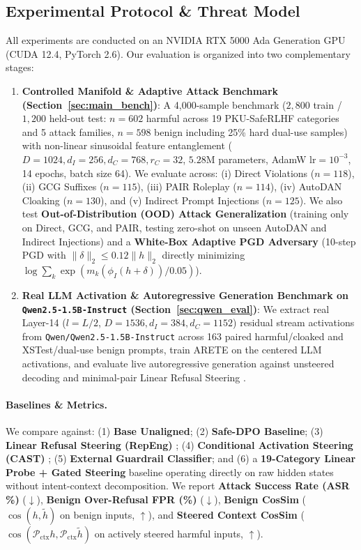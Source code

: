 \documentclass[11pt,twocolumn,a4paper]{article}
\begin{document}
\subsection{Experimental Protocol \& Threat Model}
All experiments are conducted on an NVIDIA RTX 5000 Ada Generation GPU (CUDA 12.4, PyTorch 2.6). Our evaluation is organized into two complementary stages:
\begin{enumerate}[leftmargin=*,nosep]
    \item \textbf{Controlled Manifold \& Adaptive Attack Benchmark (Section~\ref{sec:main_bench})}: A 4,000-sample benchmark ($2,800$ train / $1,200$ held-out test: $n=602$ harmful across 19 PKU-SafeRLHF categories and 5 attack families, $n=598$ benign including 25\% hard dual-use samples) with non-linear sinusoidal feature entanglement ($D=1024, d_I=256, d_C=768, r_C=32$, $5.28\text{M}$ parameters, AdamW $\text{lr}=10^{-3}$, 14 epochs, batch size 64). We evaluate across: (i) Direct Violations ($n=118$), (ii) GCG Suffixes ($n=115$), (iii) PAIR Roleplay ($n=114$), (iv) AutoDAN Cloaking ($n=130$), and (v) Indirect Prompt Injections ($n=125$). We also test \textbf{Out-of-Distribution (OOD) Attack Generalization} (training only on Direct, GCG, and PAIR, testing zero-shot on unseen AutoDAN and Indirect Injections) and a \textbf{White-Box Adaptive PGD Adversary} (10-step PGD with $\|\delta\|_2 \le 0.12\|h\|_2$ directly minimizing $\log\sum_k \exp(m_k(\phi_I(h+\delta))/0.05)$).
    \item \textbf{Real LLM Activation \& Autoregressive Generation Benchmark on \texttt{Qwen2.5-1.5B-Instruct} (Section~\ref{sec:qwen_eval})}: We extract real Layer-14 ($l = L/2$, $D=1536, d_I=384, d_C=1152$) residual stream activations from \texttt{Qwen/Qwen2.5-1.5B-Instruct} across 163 paired harmful/cloaked and XSTest/dual-use benign prompts, train ARETE on the centered LLM activations, and evaluate live autoregressive generation against unsteered decoding and minimal-pair Linear Refusal Steering \citep{arditi2024refusal}.
\end{enumerate}

\paragraph{Baselines \& Metrics.}
We compare against: (1) \textbf{Base Unaligned}; (2) \textbf{Safe-DPO Baseline}; (3) \textbf{Linear Refusal Steering (RepEng)} \citep{zou2023representation,arditi2024refusal}; (4) \textbf{Conditional Activation Steering (CAST)} \citep{lee2024programming}; (5) \textbf{External Guardrail Classifier}; and (6) a \textbf{19-Category Linear Probe + Gated Steering} baseline operating directly on raw hidden states without intent-context decomposition. We report \textbf{Attack Success Rate (ASR \%)} ($\downarrow$), \textbf{Benign Over-Refusal FPR (\%)} ($\downarrow$), \textbf{Benign CosSim} ($\cos(h, \tilde{h})$ on benign inputs, $\uparrow$), and \textbf{Steered Context CosSim} ($\cos(\mathcal{P}_{\text{ctx}}h, \mathcal{P}_{\text{ctx}}\tilde{h})$ on actively steered harmful inputs, $\uparrow$).
\end{document}
